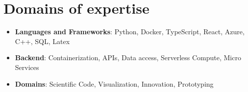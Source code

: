 \documentclass[]{friggeri-cv}
\begin{document}
\section{Domains of expertise}
\begin{itemize} 
	\item {\large\textbf{\textcolor{pblue}{Languages and Frameworks}}}: Python, Docker, TypeScript, React, Azure, C++, SQL, Latex
	\item {\large\textbf{\textcolor{pblue}{Backend}}}: Containerization, APIs, Data access, Serverless Compute, Micro Services
	\item {\large\textbf{\textcolor{pblue}{Domains}}}: Scientific Code, Visualization, Innovation, Prototyping
\end{itemize}

\vspace*{\fill}
\end{document}
